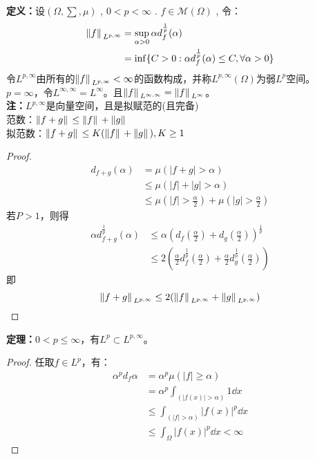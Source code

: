 {\bfseries\large 定义：}设$(\Omega,\sum,\mu)$ , $0<p<\infty$ . $f\in\mathcal{M}(\Omega)$ , 令：
\begin{equation*}
    \begin{aligned}
        \norm*{f}_{L^{p,\infty}}&=\sup_{\alpha>0}\alpha d_f^{\frac{1}{p}}(\alpha)\\
        &=\inf\{ C>0:\alpha d_{f}^{\frac{1}{p}}(\alpha)\leq C,\forall \alpha>0 \}
    \end{aligned}
\end{equation*}
令$L^{p,\infty}$由所有的$\norm*{f}_{L^{p,\infty}}<\infty$的函数构成，并称$L^{p,\infty}(\Omega)$为弱$L^p$空间。
\\
$p=\infty$，令$L^{\infty,\infty}=L^{\infty}$。且$\norm*{f}_{L^{\infty,\infty}}=\norm*{f}_{L^{\infty}}$。
\\
{\bfseries \large 注：}$L^{p,\infty}$是向量空间，且是拟赋范的(且完备)
\\
范数：$\norm*{f+g}\leq \norm*{f}+\norm*{g}$\\
拟范数：$\norm*{f+g}\leq K(\norm*{f}+\norm*{g}),K\geq 1$
\\
\begin{proof}
    \begin{equation*}
        \begin{aligned}
            d_{f+g}(\alpha)&=\mu(|f+g|>\alpha)\\
            &\leq \mu(|f|+|g|>\alpha)\\
            &\leq \mu(|f|>\frac{\alpha}{2})+\mu(|g|>\frac{\alpha}{2})
        \end{aligned}
    \end{equation*}
    若$P>1$，则得
    \begin{equation*}
        \begin{aligned}
            \alpha d_{f+g}^{\frac{1}{p}}(\alpha)
            &\leq \alpha(d_f(\frac{\alpha}{2})+d_g(\frac{\alpha}{2}))^{\frac{1}{p}}\\ &\leq 2\left(\frac{\alpha}{2}d_f^{\frac{1}{p}}(\frac{\alpha}{2})+\frac{\alpha}{2}d_g^{\frac{1}{p}}(\frac{\alpha}{2})\right)
        \end{aligned}
    \end{equation*}
    即
    \begin{equation*}
        \norm*{f+g}_{L^{p,\infty}}\leq 2(\norm*{f}_{L^{p,\infty}} + \norm*{g}_{L^{p,\infty}} )
    \end{equation*}
\end{proof}

{\bfseries \large 定理：}$0<p\leq \infty$，有$L^p\subset L^{p,\infty}$。
\begin{proof}
    任取$f\in L^p$，有：
    \begin{equation*}
        \begin{aligned}
         \alpha^p d_f{\alpha}&=\alpha^p \mu(|f|\geq \alpha)\\
         &=\alpha^p\int_{(|f(x)|>\alpha)}1\dd x\\
         &\leq \int_{(|f|>\alpha)}|f(x)|^p\dd x\\
         &\leq \int_{\Omega}|f(x)|^p\dd x<\infty 
        \end{aligned}
    \end{equation*}
\end{proof}

